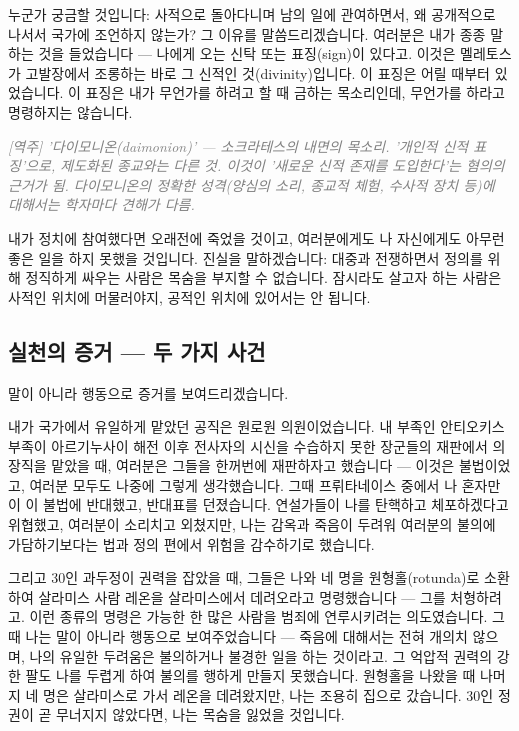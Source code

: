 \documentclass[11pt, a4paper]{article}
\newcommand{\tnote}[1]{\par\noindent\textit{\textcolor{gray}{[역주] #1}}\par\smallskip}
\begin{document}
누군가 궁금할 것입니다: 사적으로 돌아다니며 남의 일에 관여하면서, 왜 공개적으로 나서서 국가에 조언하지 않는가? 그 이유를 말씀드리겠습니다. 여러분은 내가 종종 말하는 것을 들었습니다 — 나에게 오는 신탁 또는 표징(sign)이 있다고. 이것은 멜레토스가 고발장에서 조롱하는 바로 그 신적인 것(divinity)입니다. 이 표징은 어릴 때부터 있었습니다. 이 표징은 내가 무언가를 하려고 할 때 금하는 목소리인데, 무언가를 하라고 명령하지는 않습니다.


\tnote{'다이모니온(daimonion)' — 소크라테스의 내면의 목소리. '개인적 신적 표징'으로, 제도화된 종교와는 다른 것. 이것이 '새로운 신적 존재를 도입한다'는 혐의의 근거가 됨. 다이모니온의 정확한 성격(양심의 소리, 종교적 체험, 수사적 장치 등)에 대해서는 학자마다 견해가 다름.}


내가 정치에 참여했다면 오래전에 죽었을 것이고, 여러분에게도 나 자신에게도 아무런 좋은 일을 하지 못했을 것입니다. 진실을 말하겠습니다: 대중과 전쟁하면서 정의를 위해 정직하게 싸우는 사람은 목숨을 부지할 수 없습니다. 잠시라도 살고자 하는 사람은 사적인 위치에 머물러야지, 공적인 위치에 있어서는 안 됩니다.


\bigskip


\subsection{실천의 증거 — 두 가지 사건}


말이 아니라 행동으로 증거를 보여드리겠습니다.


내가 국가에서 유일하게 맡았던 공직은 원로원 의원이었습니다. 내 부족인 안티오키스 부족이 아르기누사이 해전 이후 전사자의 시신을 수습하지 못한 장군들의 재판에서 의장직을 맡았을 때, 여러분은 그들을 한꺼번에 재판하자고 했습니다 — 이것은 불법이었고, 여러분 모두도 나중에 그렇게 생각했습니다. 그때 프뤼타네이스 중에서 나 혼자만이 이 불법에 반대했고, 반대표를 던졌습니다. 연설가들이 나를 탄핵하고 체포하겠다고 위협했고, 여러분이 소리치고 외쳤지만, 나는 감옥과 죽음이 두려워 여러분의 불의에 가담하기보다는 법과 정의 편에서 위험을 감수하기로 했습니다.


그리고 30인 과두정이 권력을 잡았을 때, 그들은 나와 네 명을 원형홀(rotunda)로 소환하여 살라미스 사람 레온을 살라미스에서 데려오라고 명령했습니다 — 그를 처형하려고. 이런 종류의 명령은 가능한 한 많은 사람을 범죄에 연루시키려는 의도였습니다. 그때 나는 말이 아니라 행동으로 보여주었습니다 — 죽음에 대해서는 전혀 개의치 않으며, 나의 유일한 두려움은 불의하거나 불경한 일을 하는 것이라고. 그 억압적 권력의 강한 팔도 나를 두렵게 하여 불의를 행하게 만들지 못했습니다. 원형홀을 나왔을 때 나머지 네 명은 살라미스로 가서 레온을 데려왔지만, 나는 조용히 집으로 갔습니다. 30인 정권이 곧 무너지지 않았다면, 나는 목숨을 잃었을 것입니다.
\end{document}
